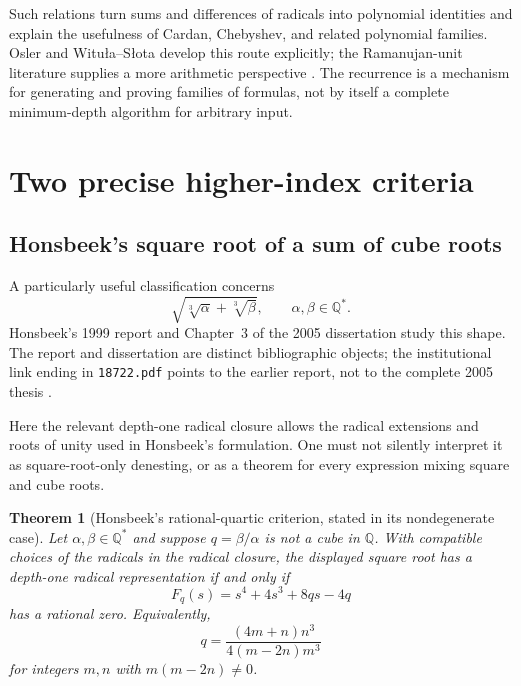 \documentclass[11pt,letterpaper]{article}
\numberwithin{equation}{section}
\newtheorem{theorem}{Theorem}[section]
\theoremstyle{definition}
\theoremstyle{remark}
\newcommand{\Q}{\mathbb{Q}}
\begin{document}
Such relations turn sums and differences of radicals into polynomial identities and explain the usefulness of Cardan, Chebyshev, and related polynomial families. Osler and Witu\l a--S\l ota develop this route explicitly; the Ramanujan-unit literature supplies a more arithmetic perspective \cite{osler,witula,berndt98}. The recurrence is a mechanism for generating and proving families of formulas, not by itself a complete minimum-depth algorithm for arbitrary input.

\section{Two precise higher-index criteria}\label{sec:highercriteria}

\subsection{Honsbeek's square root of a sum of cube roots}
A particularly useful classification concerns
\[
\sqrt{\sqrt[3]{\alpha}+\sqrt[3]{\beta}},
\qquad \alpha,\beta\in\Q^*.
\]
Honsbeek's 1999 report and Chapter~3 of the 2005 dissertation study this shape. The report and dissertation are distinct bibliographic objects; the institutional link ending in \texttt{18722.pdf} points to the earlier report, not to the complete 2005 thesis \cite{honsbeek99,honsbeek}.

Here the relevant depth-one radical closure allows the radical extensions and roots of unity used in Honsbeek's formulation. One must not silently interpret it as square-root-only denesting, or as a theorem for every expression mixing square and cube roots.

\begin{theorem}[Honsbeek's rational-quartic criterion, stated in its nondegenerate case]\label{thm:honsbeek}
Let $\alpha,\beta\in\Q^*$ and suppose $q=\beta/\alpha$ is not a cube in $\Q$. With compatible choices of the radicals in the radical closure, the displayed square root has a depth-one radical representation if and only if
\begin{equation}\label{eq:honsquartic}
F_q(s)=s^4+4s^3+8qs-4q
\end{equation}
has a rational zero. Equivalently,
\begin{equation}\label{eq:honsratio}
q=\frac{(4m+n)n^3}{4(m-2n)m^3}
\end{equation}
for integers $m,n$ with $m(m-2n)\ne0$.
\end{theorem}
\end{document}
